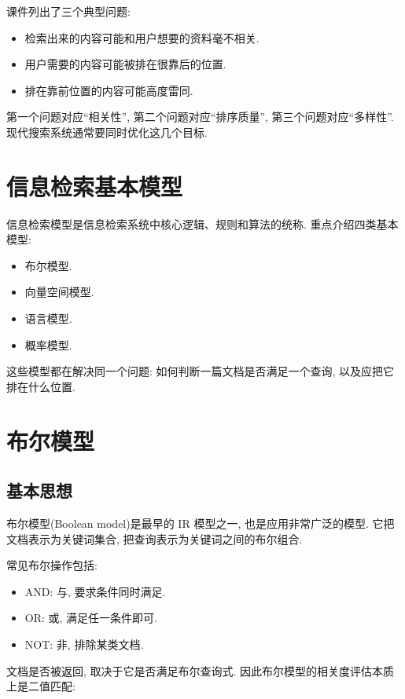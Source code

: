 课件列出了三个典型问题:

\begin{itemize}
\item 检索出来的内容可能和用户想要的资料毫不相关.
\item 用户需要的内容可能被排在很靠后的位置.
\item 排在靠前位置的内容可能高度雷同.
\end{itemize}

第一个问题对应“相关性”,
第二个问题对应“排序质量”,
第三个问题对应“多样性”.
现代搜索系统通常要同时优化这几个目标.

\section{信息检索基本模型}


信息检索模型是信息检索系统中核心逻辑、规则和算法的统称.
重点介绍四类基本模型:

\begin{itemize}
\item 布尔模型.
\item 向量空间模型.
\item 语言模型.
\item 概率模型.
\end{itemize}

这些模型都在解决同一个问题:
如何判断一篇文档是否满足一个查询, 以及应把它排在什么位置.

\section{布尔模型}


\subsection{基本思想}


布尔模型(Boolean model)是最早的 IR 模型之一, 也是应用非常广泛的模型.
它把文档表示为关键词集合, 把查询表示为关键词之间的布尔组合.

常见布尔操作包括:

\begin{itemize}
\item AND: 与, 要求条件同时满足.
\item OR: 或, 满足任一条件即可.
\item NOT: 非, 排除某类文档.
\end{itemize}

文档是否被返回, 取决于它是否满足布尔查询式.
因此布尔模型的相关度评估本质上是二值匹配:

